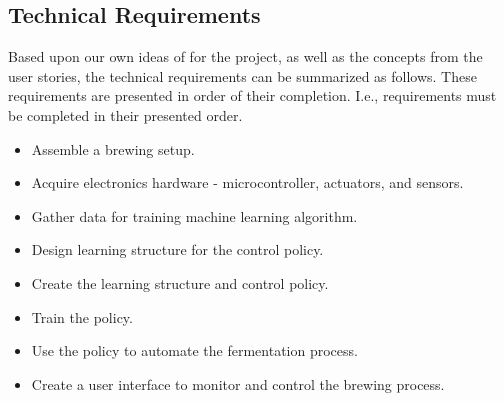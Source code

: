 \documentclass[draftclsnofoot,onecolumn,letterpaper,10pt]{article}
\begin{document}
\subsection{Technical Requirements}
Based upon our own ideas of for the project, as well as the concepts from the user stories, the technical requirements can be summarized as follows.
These requirements are presented in order of their completion.
I.e., requirements must be completed in their presented order.
\begin{itemize}
	\item Assemble a brewing setup.
	\item Acquire electronics hardware - microcontroller, actuators, and sensors.
	\item Gather data for training machine learning algorithm.
	\item Design learning structure for the control policy.
	\item Create the learning structure and control policy.
	\item Train the policy.
	\item Use the policy to automate the fermentation process.
	\item Create a user interface to monitor and control the brewing process.
\end{itemize}
\end{document}
